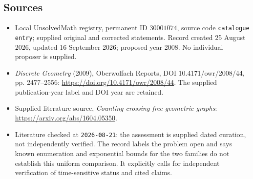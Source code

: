 \documentclass[11pt]{article}
\begin{document}
\subsection{Sources}
\begin{itemize}
\item Local UnsolvedMath registry, permanent ID $30001074$, source code \texttt{catalogue entry}; supplied original and corrected statements. Record created 25 August 2026, updated 16 September 2026; proposed year 2008. No individual proposer is supplied.
\item \emph{Discrete Geometry} (2009), Oberwolfach Reports, DOI 10.4171/owr/2008/44, pp. 2477--2556: \url{https://doi.org/10.4171/owr/2008/44}. The supplied publication-year label and DOI year are retained.
\item Supplied literature source, \emph{Counting crossing-free geometric graphs}: \url{https://arxiv.org/abs/1604.05350}.
\item Literature checked at \texttt{2026-08-21}: the assessment is supplied dated curation, not independently verified. The record labels the problem open and says known enumeration and exponential bounds for the two families do not establish this uniform comparison. It explicitly calls for independent verification of time-sensitive status and cited claims.
\end{itemize}
\end{document}
